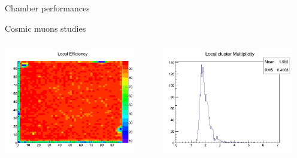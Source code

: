 \documentclass[10pt]{beamer}
\begin{document}
\begin{frame}{Chamber performances  }
\begin{block}{ Cosmic muons studies}
  \begin{columns}

      \begin{column}{0.5\textwidth}
        \centerline{\includegraphics[width=0.9\textwidth]{jpg/LocalEfficiency}}
      \end{column}
      \begin{column}{0.5\textwidth}
        \centerline{\includegraphics[width=0.9\textwidth]{jpg/LocalMultiplicity}}
      \end{column}
    \end{columns}
\end{block}

\end{frame}
\end{document}
